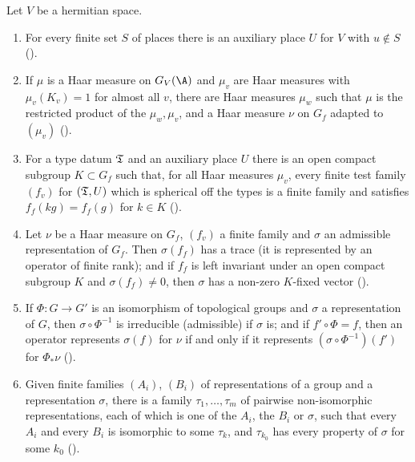 \begin{lemma}\label{pf:multnc:aux}
Let $V$ be a hermitian space.
\begin{enumerate}[label=(\alph*)]
\item For every finite set $S$ of places there is an auxiliary place $U$ for $V$ with $u\notin S$
().
\item If $\mu$ is a Haar measure on $G_V(\A)$ and $\mu_v$ are Haar measures with $\mu_v(K_v)=1$ for almost all $v$, there
are Haar measures $\mu_w$ such that $\mu$ is the restricted product of the $\mu_w,\mu_v$, and a Haar measure $\nu$ on $G_f$
adapted to $(\mu_v)$ ().
\item For a type datum $\mathfrak{T}$ and an auxiliary place $U$ there is an open compact subgroup $K\subset G_f$ such that,
for all Haar measures $\mu_v$, every finite test family $(f_v)$ for $(\mathfrak{T},U)$ which is spherical off the types is a
finite family and satisfies $f_f(kg)=f_f(g)$ for $k\in K$
().
\item Let $\nu$ be a Haar measure on $G_f$, $(f_v)$ a finite family and $\sigma$ an admissible representation of $G_f$.
Then $\sigma(f_f)$ has a trace (it is represented by an operator of finite rank); and if $f_f$ is left invariant under an
open compact subgroup $K$ and $\sigma(f_f)\ne0$, then $\sigma$ has a non-zero $K$-fixed vector
().
\item If $\Phi\colon G\to G'$ is an isomorphism of topological groups and $\sigma$ a representation of $G$, then
$\sigma\circ\Phi^{-1}$ is irreducible (admissible) if $\sigma$ is; and if $f'\circ\Phi=f$, then an operator represents
$\sigma(f)$ for $\nu$ if and only if it represents $(\sigma\circ\Phi^{-1})(f')$ for $\Phi_*\nu$
().
\item Given finite families $(A_i)$, $(B_i)$ of representations of a group and a representation $\sigma$, there is a family
$\tau_1,\dots,\tau_m$ of pairwise non-isomorphic representations, each of which is one of the $A_i$, the $B_i$ or $\sigma$,
such that every $A_i$ and every $B_i$ is isomorphic to some $\tau_k$, and $\tau_{k_0}$ has every property of $\sigma$ for
some $k_0$ ().
\end{enumerate}
\end{lemma}

